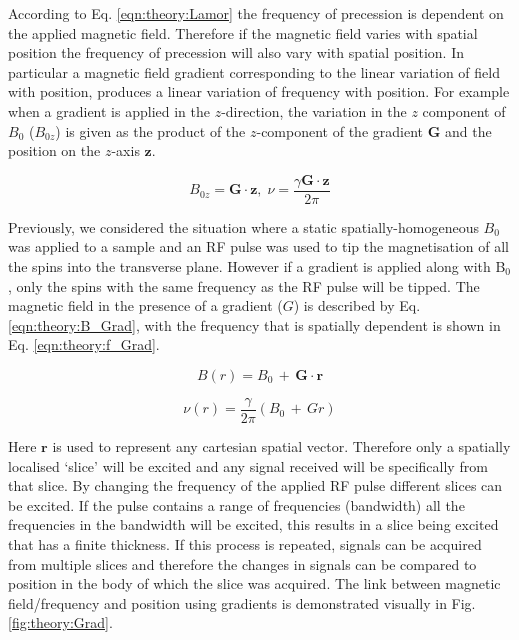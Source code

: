 According to Eq. \ref{eqn:theory:Lamor} the frequency of precession is dependent on the applied magnetic field. Therefore if the magnetic field varies with spatial position the frequency of precession will also vary with spatial position. In particular a magnetic field gradient corresponding to the linear variation of field with position, produces a linear variation of frequency with position. For example when a gradient is applied in the $z$-direction, the variation in the $z$ component of $B_0$ ($B_{0z}$) is given as the product of the $z$-component of the gradient $\mathbf{G}$ and the position on the $z$-axis $\mathbf{z}$.

\begin{equation}
    B_{0z} = \mathbf{G}\cdot \mathbf{z},\; \nu = \frac{\gamma \mathbf{G} \cdot \mathbf{z}}{2\pi} 
\end{equation}

Previously, we considered the situation where a static spatially-homogeneous $B_0$ was applied to a sample and an \ac{RF} pulse was used to tip the magnetisation of all the spins into the transverse plane. However if a gradient is applied along with B$_0$, only the spins with the same frequency as the \ac{RF} pulse will be tipped. The magnetic field in the presence of a gradient ($G$) is described by Eq. \ref{eqn:theory:B_Grad}, with the frequency that is spatially dependent is shown in Eq. \ref{eqn:theory:f_Grad}.

\begin{equation}
    B(r) = B_0 \, + \, \mathbf{G} \cdot \mathbf{r}
    \label{eqn:theory:B_Grad}
\end{equation}

\begin{equation}
    \nu(r) = \frac{\gamma}{2\pi}(B_0 \, + \, Gr)
    \label{eqn:theory:f_Grad}
\end{equation}

\noindent Here $\mathbf{r}$ is used to represent any cartesian spatial vector. Therefore only a spatially localised `slice' will be excited and any signal received will be specifically from that slice. By changing the frequency of the applied \ac{RF} pulse different slices can be excited. If the pulse contains a range of frequencies (bandwidth) all the frequencies in the bandwidth will be excited, this results in a slice being excited that has a finite thickness. If this process is repeated, signals can be acquired from multiple slices and therefore the changes in signals can be compared to position in the body of which the slice was acquired. The link between magnetic field/frequency and position using gradients is demonstrated visually in Fig. \ref{fig:theory:Grad}.

